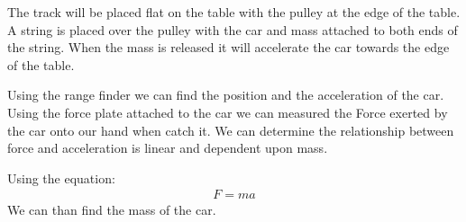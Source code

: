 \documentclass{article}
\begin{document}
    The track will be placed flat on the table with the pulley at the edge of the table. A string is placed over the pulley with the car and mass attached to both ends of the string. When the mass is released it will accelerate the car towards the edge of the table.

    Using the range finder we can find the position and the acceleration of the car. Using the force plate attached to the car we can measured the Force exerted by the car onto our hand when catch it. We can determine the relationship between force and acceleration is linear and dependent upon mass.

    Using the equation:
    \begin{align*}
        F = ma
    \end{align*}
    We can than find the mass of the car.
 
\end{document}
